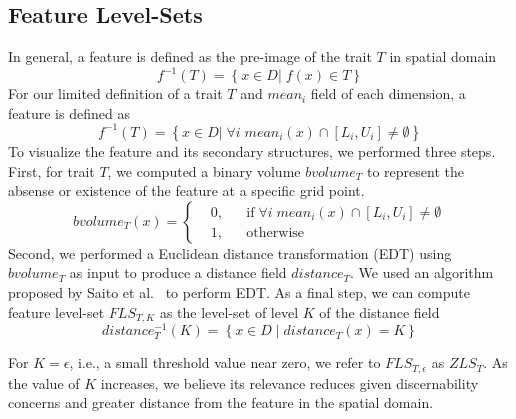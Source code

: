 \vspace{-2mm}
\subsection{Feature Level-Sets}
In general, a feature is defined as the pre-image of the trait $T$ in spatial domain
\begin{equation}
f^{-1}(T) = \left\{ x \in D |\; f(x) \in T \right\}
\end{equation}
%
For our limited definition of a trait $T$ and $mean_{i}$ field of each dimension, a feature is defined as 
\begin{equation}
f^{-1}(T) = \left\{ x \in D |\; \forall i\;mean_{i}(x) \cap [L_{i}, U_{i}] \neq \emptyset\right\}
\end{equation}
To visualize the feature and its secondary structures, we performed three steps.
%
First, for trait $T$, we computed a binary volume $bvolume_{T}$ to represent the absense or existence of the feature at a specific grid point.
%
\begin{equation}
  bvolume_{T}(x) = \left \{
  \begin{aligned}
    &0, && \text{if}\; \forall i\; mean_{i}(x) \cap [L_{i}, U_{i}] \neq \emptyset \\
    &1, && \text{otherwise}
  \end{aligned} \right.
\end{equation}
%
Second, we performed a Euclidean distance transformation (EDT) using $bvolume_{T}$ as input to produce a distance field $distance_{T}$. 
%
We used an algorithm proposed by Saito et al.~\cite{saito1994new} to perform EDT.
%
As a final step, we can compute feature level-set $FLS_{T,K}$ as the level-set of level $K$ of the distance field
%
\begin{equation} 
distance_{T}^{-1}(K) = \left\{ x \in D\; |\; distance_{T}(x) = K\right\}
\end{equation}

For $K = \epsilon$, i.e., a small threshold value near zero, we refer to $FLS_{T,\epsilon}$ as $ZLS_{T}$.
%
As the value of $K$ increases, we believe its relevance reduces given discernability concerns and greater distance from the feature in the spatial domain.
%

\vspace{-2mm}
